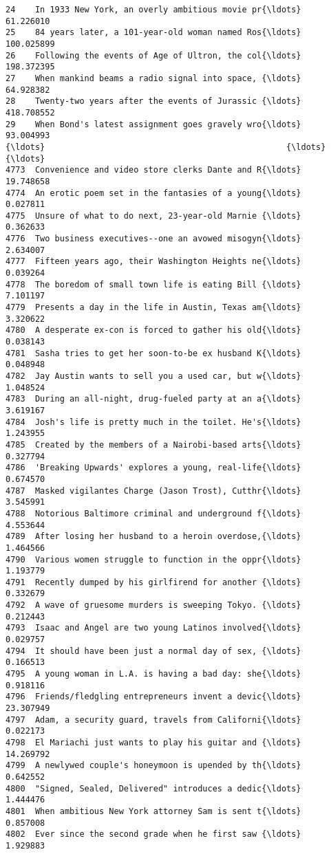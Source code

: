 \documentclass[11pt]{article}
\begin{document}
\begin{Verbatim}[commandchars=\\\{\}]
24    In 1933 New York, an overly ambitious movie pr{\ldots}   61.226010   
25    84 years later, a 101-year-old woman named Ros{\ldots}  100.025899   
26    Following the events of Age of Ultron, the col{\ldots}  198.372395   
27    When mankind beams a radio signal into space, {\ldots}   64.928382   
28    Twenty-two years after the events of Jurassic {\ldots}  418.708552   
29    When Bond's latest assignment goes gravely wro{\ldots}   93.004993   
{\ldots}                                                 {\ldots}         {\ldots}   
4773  Convenience and video store clerks Dante and R{\ldots}   19.748658   
4774  An erotic poem set in the fantasies of a young{\ldots}    0.027811   
4775  Unsure of what to do next, 23-year-old Marnie {\ldots}    0.362633   
4776  Two business executives--one an avowed misogyn{\ldots}    2.634007   
4777  Fifteen years ago, their Washington Heights ne{\ldots}    0.039264   
4778  The boredom of small town life is eating Bill {\ldots}    7.101197   
4779  Presents a day in the life in Austin, Texas am{\ldots}    3.320622   
4780  A desperate ex-con is forced to gather his old{\ldots}    0.038143   
4781  Sasha tries to get her soon-to-be ex husband K{\ldots}    0.048948   
4782  Jay Austin wants to sell you a used car, but w{\ldots}    1.048524   
4783  During an all-night, drug-fueled party at an a{\ldots}    3.619167   
4784  Josh's life is pretty much in the toilet. He's{\ldots}    1.243955   
4785  Created by the members of a Nairobi-based arts{\ldots}    0.327794   
4786  'Breaking Upwards' explores a young, real-life{\ldots}    0.674570   
4787  Masked vigilantes Charge (Jason Trost), Cutthr{\ldots}    3.545991   
4788  Notorious Baltimore criminal and underground f{\ldots}    4.553644   
4789  After losing her husband to a heroin overdose,{\ldots}    1.464566   
4790  Various women struggle to function in the oppr{\ldots}    1.193779   
4791  Recently dumped by his girlfirend for another {\ldots}    0.332679   
4792  A wave of gruesome murders is sweeping Tokyo. {\ldots}    0.212443   
4793  Isaac and Angel are two young Latinos involved{\ldots}    0.029757   
4794  It should have been just a normal day of sex, {\ldots}    0.166513   
4795  A young woman in L.A. is having a bad day: she{\ldots}    0.918116   
4796  Friends/fledgling entrepreneurs invent a devic{\ldots}   23.307949   
4797  Adam, a security guard, travels from Californi{\ldots}    0.022173   
4798  El Mariachi just wants to play his guitar and {\ldots}   14.269792   
4799  A newlywed couple's honeymoon is upended by th{\ldots}    0.642552   
4800  "Signed, Sealed, Delivered" introduces a dedic{\ldots}    1.444476   
4801  When ambitious New York attorney Sam is sent t{\ldots}    0.857008   
4802  Ever since the second grade when he first saw {\ldots}    1.929883   


\end{Verbatim}
\end{document}
